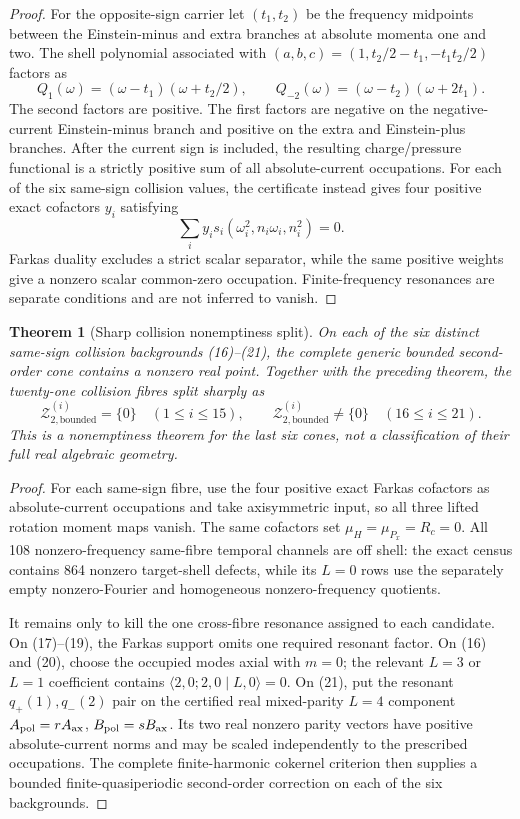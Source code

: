 \documentclass[11pt]{article}
\newtheorem{theorem}{Theorem}[section]
\theoremstyle{definition}
\theoremstyle{remark}
\newcommand{\cZ}{\mathcal Z}
\begin{document}
\begin{proof}
For the opposite-sign carrier let \((t_1,t_2)\) be the frequency midpoints
between the Einstein-minus and extra branches at absolute momenta one and
two.  The shell polynomial associated with
\((a,b,c)=(1,t_2/2-t_1,-t_1t_2/2)\) factors as
\[
 Q_1(\omega)=(\omega-t_1)(\omega+t_2/2),\qquad
 Q_{-2}(\omega)=(\omega-t_2)(\omega+2t_1).
\]
The second factors are positive.  The first factors are negative on the
negative-current Einstein-minus branch and positive on the extra and
Einstein-plus branches.  After the current sign is included, the resulting
charge/pressure functional is a strictly positive sum of all absolute-current
occupations.  For each of the six same-sign collision values, the certificate
instead gives four positive exact cofactors \(y_i\) satisfying
\[
 \sum_i y_i s_i(\omega_i^2,n_i\omega_i,n_i^2)=0.
\]
Farkas duality excludes a strict scalar separator, while the same positive
weights give a nonzero scalar common-zero occupation.  Finite-frequency
resonances are separate conditions and are not inferred to vanish.
\end{proof}

\begin{theorem}[Sharp collision nonemptiness split]\label{thm:collision-nonemptiness}
On each of the six distinct same-sign collision backgrounds (16)--(21), the
complete generic bounded second-order cone contains a nonzero real point.
Together with the preceding theorem, the twenty-one collision fibres split
sharply as
\[
 \cZ_{2,\mathrm{bounded}}^{(i)}=\{0\}\quad(1\leq i\leq15),
 \qquad
 \cZ_{2,\mathrm{bounded}}^{(i)}\neq\{0\}\quad(16\leq i\leq21).
\]
This is a nonemptiness theorem for the last six cones, not a classification
of their full real algebraic geometry.
\end{theorem}

\begin{proof}
For each same-sign fibre, use the four positive exact Farkas cofactors as
absolute-current occupations and take axisymmetric input, so all three
lifted rotation moment maps vanish.  The same cofactors set
\(\mu_H=\mu_{P_x}=R_c=0\).  All 108 nonzero-frequency same-fibre temporal
channels are off shell: the exact census contains 864 nonzero target-shell
defects, while its \(L=0\) rows use the separately empty nonzero-Fourier and
homogeneous nonzero-frequency quotients.

It remains only to kill the one cross-fibre resonance assigned to each
candidate.  On (17)--(19), the Farkas support omits one required resonant
factor.  On (16) and (20), choose the occupied modes axial with \(m=0\);
the relevant \(L=3\) or \(L=1\) coefficient contains
\(\langle2,0;2,0\mid L,0\rangle=0\).  On (21), put the resonant
\(q_+(1),q_-(2)\) pair on the certified real mixed-parity \(L=4\) component
\(A_{\rm pol}=rA_{\rm ax}\), \(B_{\rm pol}=sB_{\rm ax}\).  Its two real
nonzero parity vectors have positive absolute-current norms and may be scaled
independently to the prescribed occupations.  The complete finite-harmonic
cokernel criterion then supplies a bounded finite-quasiperiodic second-order
correction on each of the six backgrounds.
\end{proof}
\end{document}
